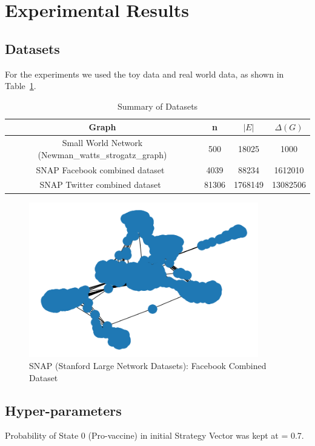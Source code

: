 \section{Experimental Results}
\subsection{Datasets}

For the experiments we used the toy data and real world data, as shown in Table~\ref{table:dataset}.

\begin{table}[H]
\centering
\caption{Summary of Datasets}
\label{table:dataset}
\begingroup
\setlength{\tabcolsep}{4pt}
\renewcommand{\arraystretch}{1.35}
\begin{tabular}{|c|c|c|c|}
\hline
Graph          & n & $|E|$ & $\Delta(G)$\\ \hline
Small World Network (Newman\_watts\_strogatz\_graph) & 500 & 18025 &  1000\\ \hline
SNAP Facebook combined dataset~\cite{facebook_combine_data}  & 4039 & 88234 & 1612010\\ \hline
SNAP Twitter combined dataset~\cite{twitter_combined_data}  & 81306 & 1768149 & 13082506\\ \hline
\end{tabular}
\endgroup
\end{table}

\begin{figure}[H]
    \centering
    \includegraphics[width=10cm]{figs/facebook_data.png}
    \caption{SNAP (Stanford Large Network Datasets): Facebook Combined Dataset}
    \label{fig:facebook_dataset}
\end{figure}

\subsection{Hyper-parameters}
Probability of State 0 (Pro-vaccine) in initial Strategy Vector was kept at = 0.7.

